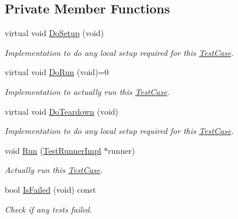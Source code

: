 \subsection*{Private Member Functions}
\begin{DoxyCompactItemize}
\item 
virtual void \hyperlink{classns3_1_1TestCase_a4a7e32ad32a10a508910815cd38e9177}{Do\+Setup} (void)
\begin{DoxyCompactList}\small\item\em Implementation to do any local setup required for this \hyperlink{classns3_1_1TestCase}{Test\+Case}. \end{DoxyCompactList}\item 
virtual void \hyperlink{classns3_1_1TestCase_a8ff74680cf017ed42011e4be51917a24}{Do\+Run} (void)=0
\begin{DoxyCompactList}\small\item\em Implementation to actually run this \hyperlink{classns3_1_1TestCase}{Test\+Case}. \end{DoxyCompactList}\item 
virtual void \hyperlink{classns3_1_1TestCase_a8917f1604e28d312a8086f76291e3c46}{Do\+Teardown} (void)
\begin{DoxyCompactList}\small\item\em Implementation to do any local setup required for this \hyperlink{classns3_1_1TestCase}{Test\+Case}. \end{DoxyCompactList}\item 
void \hyperlink{classns3_1_1TestCase_abd20623e3e8fcb6bd4ec69e93f32f621}{Run} (\hyperlink{classns3_1_1TestRunnerImpl}{Test\+Runner\+Impl} $\ast$runner)
\begin{DoxyCompactList}\small\item\em Actually run this \hyperlink{classns3_1_1TestCase}{Test\+Case}. \end{DoxyCompactList}\item 
bool \hyperlink{classns3_1_1TestCase_a7b8273bd67aad00c3afe709628522576}{Is\+Failed} (void) const 
\begin{DoxyCompactList}\small\item\em Check if any tests failed. \end{DoxyCompactList}\end{DoxyCompactItemize}
